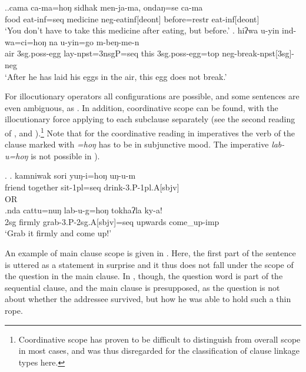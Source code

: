 \ex.\ag.\label{camahong}cama ca-ma=hoŋ sidhak men-ja-ma, ondaŋ=se ca-ma\\
			food eat{\sc -inf=seq} medicine {\sc neg-}eat{\sc inf[deont]} before={\sc restr} eat{\sc -inf[deont]}\\
			‘You don’t have to take this medicine after eating, but before.’
	\bg.	hiʔwa u-yin ind-wa=ci=hoŋ na u-yin=go m-beŋ-me-n\\
			air {\sc 3sg.poss-}egg lay-{\sc npst=3nsgP=seq} this {\sc 3sg.poss-}egg={\sc top}  {\sc neg-}break{\sc -npst[3sg]-neg}\\
			‘After he has laid his eggs in the air, this egg does not break.’ 

			
For illocutionary operators all configurations are possible, and some sentences are even ambiguous, as \Next[a]. In addition,  coordinative scope can be found, with the illocutionary force applying to each subclause separately (see the second reading of \Next[a], and \Next[b]).\footnote{Coordinative scope has proven to be difficult to distinguish from overall scope in most cases, and was thus disregarded for the classification of clause linkage types here.} Note that for the coordinative reading in imperatives the verb of the clause marked with \emph{=hoŋ} has to be in subjunctive mood. The imperative \emph{lab-u=hoŋ} is not possible in \Next[b]).

\ex. \ag. kamniwak sori yuŋ-i=hoŋ uŋ-u-m\\
	friend together sit{\sc -1pl=seq} drink-3.P-1pl.A[sbjv]\\
		  OR\\
	\bg.\label{ex_hong_imp_coord}nda cattu=nuŋ lab-u-g=hoŋ tokhaʔla ky-a!\\
			{\sc 2sg} firmly grab{\sc -3.P-2sg.A[sbjv]=seq} upwards come\_up{\sc -imp}\\
			‘Grab it firmly and come up!’ 
			

An example of main clause scope is given in \Next[a]. Here, the first part of the sentence is uttered as a statement in surprise and it thus does not fall under the scope of the question in the main clause. In \Next[b], though, the question word is part of the sequential clause, and the main clause is presupposed, as the question is not about whether the addressee survived, but how he was able to hold such a thin rope.

